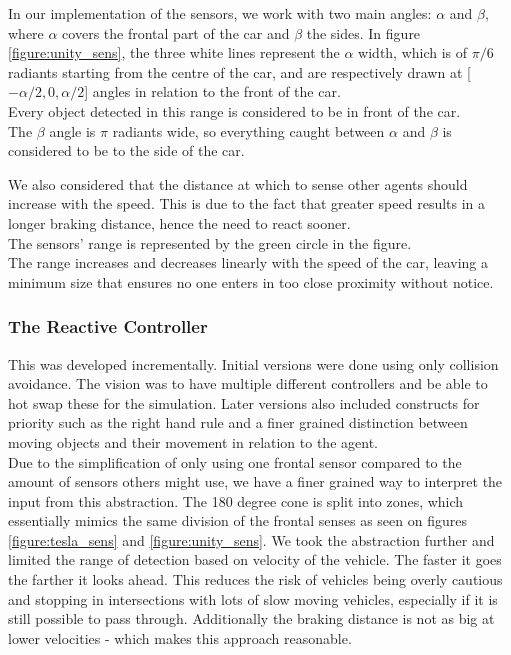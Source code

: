 In our implementation of the sensors, we work with two main angles: $\alpha$ and $\beta$, where $\alpha$  covers the frontal part of the car and $\beta$ the sides.
In figure \ref{figure:unity_sens}, the three white lines represent the $\alpha$ width, which is of $\pi/6$ radiants starting from the centre of the car, and are respectively drawn at [$-\alpha/2, 0, \alpha/2$] angles in relation to the front of the car.\\
Every object detected in this range is considered to be in front of the car.\\

The $\beta$ angle is $\pi$ radiants wide, so everything caught between $\alpha$ and $\beta$ is considered to be to the side of the car.


We also considered that the distance at which to sense other agents should increase with the speed.
This is due to the fact that greater speed results in a longer braking distance, hence the need to react sooner.\\
The sensors' range is represented by the green circle in the figure. \\
The range increases and decreases linearly with the speed of the car, leaving a minimum size that ensures no one enters in too close proximity without notice. 



\subsubsection{The Reactive Controller}
This was developed incrementally. Initial versions were done using only collision avoidance.
The vision was to have multiple different controllers and be able to hot swap these for the simulation.
Later versions also included constructs for priority such as the right hand rule and a finer grained distinction between moving objects and their movement in relation to the agent.\\

Due to the simplification of only using one frontal sensor compared to the amount of sensors others might use, we have a finer grained way to interpret the input from this abstraction.
The 180 degree cone is split into zones, which essentially mimics the same division of the frontal senses as seen on figures \ref{figure:tesla_sens} and \ref{figure:unity_sens}.
We took the abstraction further and limited the range of detection based on velocity of the vehicle. The faster it goes the farther it looks ahead.
This reduces the risk of vehicles being overly cautious and stopping in intersections with lots of slow moving vehicles, especially if it is still possible to pass through.
Additionally the braking distance is not as big at lower velocities - which makes this approach reasonable.\\

